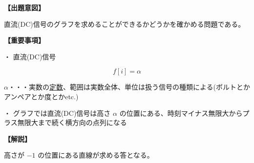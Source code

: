 \noindent \textbf{【出題意図】}

\noindent 直流(DC)信号のグラフを求めることができるかどうかを確かめる問題である。

\vspace{1em}
\noindent \textbf{【重要事項】}

\medskip
\noindent・ 直流(DC)信号

\[
f[i] = \alpha
\]

\bigskip
\noindent $\alpha$・・・実数の\underline{定数}、範囲は実数全体、単位は扱う信号の種類による(ボルトとかアンペアとか度とかetc.)

\bigskip
\noindent・ グラフでは直流(DC)信号は高さ $\alpha$ の位置にある、時刻マイナス無限大からプラス無限大まで続く横方向の点列になる

\vspace{1em}
\noindent \textbf{【解説】}

\noindent 高さが $-1$ の位置にある直線が求める答となる。
